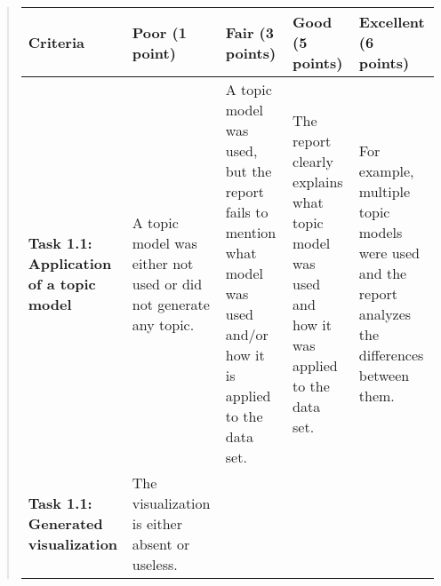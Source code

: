 \documentclass[11pt]{article}
\begin{document}
\begin{quote}
\begin{longtable}[]{@{}lllll@{}}
\toprule
\begin{minipage}[b]{0.17\columnwidth}\raggedright
Criteria\strut
\end{minipage} & \begin{minipage}[b]{0.17\columnwidth}\raggedright
Poor (1 point)\strut
\end{minipage} & \begin{minipage}[b]{0.17\columnwidth}\raggedright
Fair (3 points)\strut
\end{minipage} & \begin{minipage}[b]{0.17\columnwidth}\raggedright
Good (5 points)\strut
\end{minipage} & \begin{minipage}[b]{0.17\columnwidth}\raggedright
Excellent (6 points)\strut
\end{minipage}\tabularnewline
\midrule
\endhead
\begin{minipage}[t]{0.17\columnwidth}\raggedright
\textbf{Task 1.1: Application of a topic model}\strut
\end{minipage} & \begin{minipage}[t]{0.17\columnwidth}\raggedright
A topic model was either not used or did not generate any topic.\strut
\end{minipage} & \begin{minipage}[t]{0.17\columnwidth}\raggedright
A topic model was used, but the report fails to mention what model was
used and/or how it is applied to the data set.\strut
\end{minipage} & \begin{minipage}[t]{0.17\columnwidth}\raggedright
The report clearly explains what topic model was used and how it was
applied to the data set.\strut
\end{minipage} & \begin{minipage}[t]{0.17\columnwidth}\raggedright
For example, multiple topic models were used and the report analyzes the
differences between them.\strut
\end{minipage}\tabularnewline
\begin{minipage}[t]{0.17\columnwidth}\raggedright
\textbf{Task 1.1: Generated visualization}\strut
\end{minipage} & \begin{minipage}[t]{0.17\columnwidth}\raggedright
The visualization is either absent or useless.\strut
\end{minipage} & \begin{minipage}[t]{0.17\columnwidth}\raggedright

\end{minipage}
\end{longtable}
\end{quote}
\end{document}
